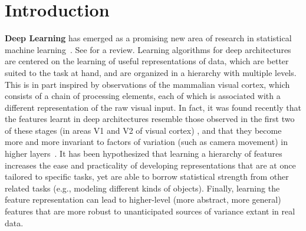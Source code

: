 \documentclass{article} %
\begin{document}
\section{Introduction}

{\bf Deep Learning} has emerged as a promising new area of research in
statistical machine learning~\citep{Hinton06,ranzato-07-small,Bengio-nips-2006,VincentPLarochelleH2008-very-small,ranzato-08,TaylorHintonICML2009,Larochelle-jmlr-2009,Salakhutdinov+Hinton-2009,HonglakL2009,HonglakLNIPS2009,Jarrett-ICCV2009,Taylor-cvpr-2010}. See \citet{Bengio-2009} for a review.
Learning algorithms for deep architectures are centered on the learning
of useful representations of data, which are better suited to the task at hand,
and are organized in a hierarchy with multiple levels.
This is in part inspired by observations of the mammalian visual cortex, 
which consists of a chain of processing elements, each of which is associated with a
different representation of the raw visual input. In fact,
it was found recently that the features learnt in deep architectures resemble
those observed in the first two of these stages (in areas V1 and V2
of visual cortex) \citep{HonglakL2008}, and that they become more and
more invariant to factors of variation (such as camera movement) in
higher layers~\citep{Goodfellow2009}.
It has been hypothesized that learning a hierarchy of features increases the
ease and practicality of developing representations that are at once
tailored to specific tasks, yet are able to borrow statistical strength
from other related tasks (e.g., modeling different kinds of objects). Finally, learning the
feature representation can lead to higher-level (more abstract, more
general) features that are more robust to unanticipated sources of
variance extant in real data.
\end{document}
